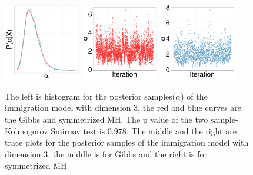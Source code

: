 {  \begin{figure}[H]
  \centering
  \begin{minipage}[!hp]{0.97\linewidth}
    \includegraphics [width=0.30\textwidth, angle=0]{figs/Q_ks/q_hist_20_03_3_.pdf}
    \includegraphics [width=0.30\textwidth, angle=0]{figs/Q_ks/q_traceGBS_20_03_3_.pdf}
    \includegraphics [width=0.30\textwidth, angle=0]{figs/Q_ks/q_traceMH_20_03_3_.pdf}
  \end{minipage}

    \caption{The left is histogram for the posterior samples($\alpha$) of the immigration model with dimension 3, the red and blue curves are the Gibbs and symmetrized MH. The p value of the two sample-Kolmogorov Smirnov test is $ 0.978$. The middle and the right are trace plots for the posterior samples of the immigration model with dimension 3, the middle is for Gibbs and the right is for symmetrized MH}
     \label{fig:TRACE_Q}
  \end{figure}

}
